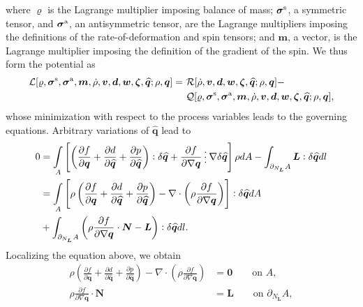 where $\varrho $ is the Lagrange multiplier imposing balance of mass; $\bm{\sigma}^{\rm s}$, a symmetric tensor, and $\bm{\sigma}^{\rm a}$, an antisymmetric tensor, are the Lagrange multipliers imposing the definitions of the rate-of-deformation and spin tensors; and $\bm{m}$, a vector, is the Lagrange multiplier imposing the definition of the gradient of the spin.  We thus form the  potential as 
\begin{equation}
	\label{eq:Lagrangian} 
	\begin{aligned}
		\mathcal{L}[\varrho, \bm{\sigma}^{\rm s}, \bm{\sigma}^{\rm a},\bm{m},\dot{\rho},\bm{v},\bm{d},\bm{w},\bm{\zeta},\widehat{\bm{q}};\rho,\bm{q}] =~& \mathcal{R}[\dot{\rho},\bm{v},\bm{d},\bm{w},\bm{\zeta},\widehat{\bm{q}};\rho,\bm{q}] -  \\
		&\mathcal{Q}[\varrho, \bm{\sigma}^{\rm s}, \bm{\sigma}^{\rm a},\bm{m}, \dot{\rho},\bm{v},\bm{d},\bm{w},\bm{\zeta},\widehat{\bm{q}};\rho,\bm{q}],
	\end{aligned}
\end{equation}
whose minimization with respect to the process variables leads to the governing equations. Arbitrary variations of $\widehat{\bm{q}}$ lead to
\begin{equation}
	\label{eq:var_q}
	\begin{aligned}
		0&=\underset{A}{\int} \left[ \left(\frac{\partial  f}{\partial \bm{q}} + \frac{\partial d}{\partial \widehat{\bm{q}}}+ \frac{\partial p}{\partial \widehat{\bm{q}}} \right) : \delta \widehat{\bm{q}} + \frac{\partial f}{\partial \nabla \bm{q}} \cdddot\, \nabla \delta \widehat{\bm{q}} \right] \rho dA - \int_{\partial_{N_{\bm{L}}}A} \bm{L}:\delta\widehat{\bm{q}} dl \\
		&=\underset{A}{\int} \left[\rho \left(\frac{\partial  f}{\partial \bm{q}} + \frac{\partial d}{\partial \widehat{\bm{q}}}+ \frac{\partial p}{\partial \widehat{\bm{q}}} \right) - \nabla\cdot \left(\rho \frac{\partial f}{\partial \nabla \bm{q}} \right)   \right] : \delta \widehat{\bm{q}}  dA \\
		&+ \int_{\partial_{N_{\bm{L}}}A} \left(\rho \frac{\partial f}{\partial \nabla \bm{q}} \cdot\bm{N} -\bm{L}\right):\delta\widehat{\bm{q}} dl. 
	\end{aligned}
\end{equation}
Localizing the equation above, we obtain
\begin{align}
	\label{eq:balance_q} 
	\rho \left(\frac{\partial  f}{\partial \bm{q}} +  \nonumber \frac{\partial d}{\partial \widehat{\bm{q}}} +  \frac{\partial p}{\partial \widehat{\bm{q}}}\right) - \nabla\cdot \left(\rho \frac{\partial f}{\partial \nabla \bm{q}}\right)   &= \bm{0} \qquad \text{on } A ,\\
	\rho \frac{\partial  f}{\partial \nabla \bm{q}} \cdot\bm{N} &= \bm{L} \qquad \text{on } \partial_{N_{\bm{L}}} A,
\end{align}
